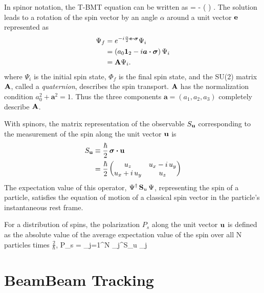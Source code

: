 In spinor notation, the T-BMT equation can be written as
  \Begineq   
     \Psi = -  \left( \bfsig \dotproduct   
    {\pmb\Omega} \right) \Psi.   
  \Endeq   
The solution leads to a rotation of the spin vector by an angle   
$\alpha$ around a unit vector ${\bf e}$ represented as   
  \begin{align}   
    \Psi_f &= e^{-i \frac{\alpha}{2} {\bf e} \mathbin{\boldsymbol{\cdot}} \boldsymbol{\sigma}} \Psi_i \nonumber \\
         &= \left( a_{0} {\bf 1}_{2} - i \boldsymbol{a} \mathbin{\boldsymbol{\cdot}} \boldsymbol{\sigma} \right) \Psi_i \\
         &= {\bf A} \Psi_i. \nonumber
  \end{align}   
where $\Psi_i$ is the initial spin state, $\Phi_f$ is the final spin
state, and the SU(2) matrix ${\bf A}$, called a \textit{quaternion},
describes the spin transport. ${\bf A}$ has the normalization condition
$a_{0}^{2} + \boldsymbol{a}^{2} = 1$. Thus the three components
$\boldsymbol{a} = \left(a_{1}, a_{2}, a_{3}\right)$ completely
describe ${\bf A}$. 

With spinors, the matrix representation of the observable $S_{{\bf u}}$
corresponding to the measurement of the spin along the unit vector
${\bf u}$ is
\begin{align}
  S_{{\bf u}} &\equiv \frac{\hbar}{2} \, \boldsymbol{\sigma} \mathbin{\boldsymbol{\cdot}} {\bf u} \\   
            &= \frac{\hbar}{2} 
                   \begin{pmatrix} 
                     u_z            & u_x - i \, u_y \\
                     u_x + i \, u_y & u_z
                   \end{pmatrix}
\end{align}
The expectation value of this operator, $\Psi^\dagger \, {\bf S}_u \,
\Psi$, representing the spin of a particle, satisfies the equation of
motion of a classical spin vector in the particle's instantaneous rest
frame.

For a distribution of spins, the polarization $P_s$ along the unit
vector ${\bf u}$ is defined as the absolute value of the average
expectation value of the spin over all N particles times
$\frac{2}{\hbar}$,
  \Begineq
    P_s =   \sum_{j=1}^{N} \Psi_j^\dagger S_{\Bf u} \Psi_j
  \Endeq  

\section{BeamBeam Tracking}
\label{s:beambeam.std}

